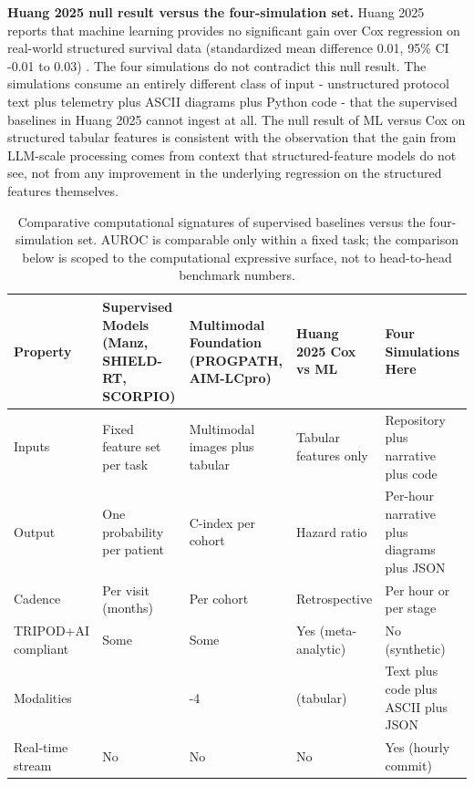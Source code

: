 \textbf{Huang 2025 null result versus the four-simulation set.}
Huang 2025 reports that machine learning provides no significant gain
over Cox regression on real-world structured survival data
(standardized mean difference 0.01, 95\% CI -0.01 to 0.03)
\cite{Huang2025CancerSurvivalMetaAnalysis}. The four simulations do
not contradict this null result. The simulations consume an entirely
different class of input - unstructured protocol text plus telemetry
plus ASCII diagrams plus Python code - that the supervised baselines
in Huang 2025 cannot ingest at all. The null result of ML versus Cox
on structured tabular features is consistent with the observation
that the gain from LLM-scale processing comes from context that
structured-feature models do not see, not from any improvement in the
underlying regression on the structured features themselves.

\begin{table}[H]
\centering
\caption{Comparative computational signatures of supervised baselines
versus the four-simulation set. AUROC is comparable only within a
fixed task; the comparison below is scoped to the computational
expressive surface, not to head-to-head benchmark numbers.}
\label{tab:disc-baseline-vs-sim}
{\renewcommand{\arraystretch}{1.15}
\begin{tabular}{>{\raggedright\arraybackslash}p{2.6cm} >{\raggedright\arraybackslash}p{2.5cm} >{\raggedright\arraybackslash}p{2.5cm} >{\raggedright\arraybackslash}p{2.4cm} >{\raggedright\arraybackslash}p{2.5cm}}
\toprule
\textbf{Property} & \textbf{Supervised Models (Manz, SHIELD-RT, SCORPIO)} & \textbf{Multimodal Foundation (PROGPATH, AIM-LCpro)} & \textbf{Huang 2025 Cox vs ML} & \textbf{Four Simulations Here} \\
\midrule
Inputs              & Fixed feature set per task    & Multimodal images plus tabular  & Tabular features only         & Repository plus narrative plus code        \\
Output              & One probability per patient   & C-index per cohort              & Hazard ratio                  & Per-hour narrative plus diagrams plus JSON \\
Cadence             & Per visit (months)            & Per cohort                      & Retrospective                 & Per hour or per stage                      \\
TRIPOD+AI compliant & Some                          & Some                            & Yes (meta-analytic)           & No (synthetic)                             \\
Modalities          & 1                             & 2-4                             & 1 (tabular)                   & Text plus code plus ASCII plus JSON         \\
Real-time stream    & No                            & No                              & No                            & Yes (hourly commit)                        \\
\bottomrule
\end{tabular}}
\end{table}

